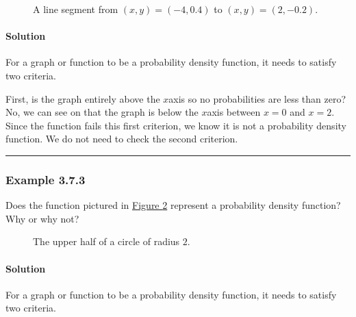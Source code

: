 \documentclass[letterpaper,10pt,english]{jupyterBook}
\begin{document}
\begin{figure}[htbp]
\centering
\capstart

\noindent{}
\caption{A line segment from \((x, y) = (-4, 0.4)\) to \((x, y) = (2, -0.2)\).}\label{\detokenize{Ch3 Probability/3.7 Continuous Probability Distributions:pdf-tri1}}\end{figure}


\paragraph{Solution}
\label{\detokenize{Ch3 Probability/3.7 Continuous Probability Distributions:id2}}
\sphinxAtStartPar
For a graph or function to be a probability density function, it needs to satisfy two criteria.

\sphinxAtStartPar
First, is the graph entirely above the \(x\)\sphinxhyphen{}axis so no probabilities are less than zero? No, we can see on that the graph is below the \(x\)\sphinxhyphen{}axis between \(x = 0\) and \(x = 2\). Since the function fails this first criterion, we know it is not a probability density function. We do not need to check the second criterion.


\bigskip\hrule\bigskip



\subsubsection{Example 3.7.3}
\label{\detokenize{Ch3 Probability/3.7 Continuous Probability Distributions:example-3-7-3}}
\sphinxAtStartPar
Does the function pictured in \hyperref[\detokenize{Ch3 Probability/3.7 Continuous Probability Distributions:pdf-circle}]{Figure \ref{\detokenize{Ch3 Probability/3.7 Continuous Probability Distributions:pdf-circle}}} represent a probability density function? Why or why not?

\begin{figure}[htbp]
\centering
\capstart

\noindent{}
\caption{The upper half of a circle of radius \(2\).}\label{\detokenize{Ch3 Probability/3.7 Continuous Probability Distributions:pdf-circle}}\end{figure}


\paragraph{Solution}
\label{\detokenize{Ch3 Probability/3.7 Continuous Probability Distributions:id3}}
\sphinxAtStartPar
For a graph or function to be a probability density function, it needs to satisfy two criteria.
\end{document}
